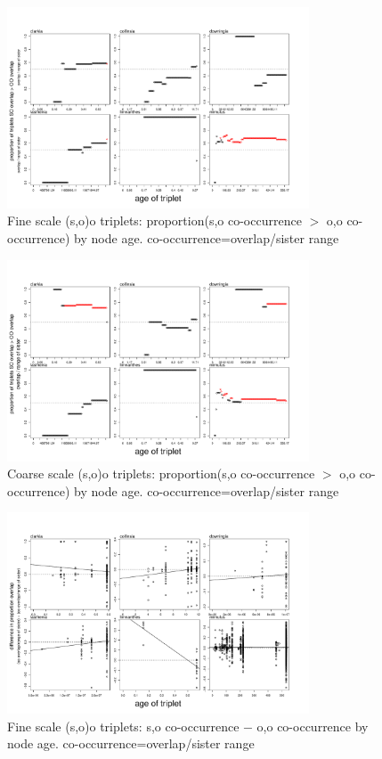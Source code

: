 \documentclass[12pt,letterpaper]{article}
\begin{document}
\begin{figure}[h!]
 \caption{Fine scale (s,o)o triplets: proportion(s,o co-occurrence $>$ o,o co-occurrence) by node age. co-occurrence=overlap/sister range}
 \centering
 \includegraphics[width=0.8\textwidth]{triplets_signtest_res008}
\end{figure}

\begin{figure}[h!]
\centering
\caption{Coarse scale (s,o)o triplets: proportion(s,o co-occurrence $>$ o,o co-occurrence) by node age. co-occurrence=overlap/sister range}
\includegraphics[width=0.8\textwidth]{triplets_signtest_res5}
\end{figure}

\begin{figure}[h!]
 \caption{Fine scale (s,o)o triplets: s,o co-occurrence $-$ o,o co-occurrence by node age. co-occurrence=overlap/sister range}
 \centering
 \includegraphics[width=0.8\textwidth]{tripletsAll008}
\end{figure}
\end{document}

